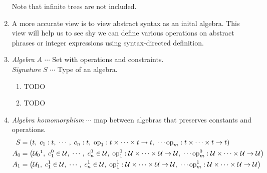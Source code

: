 \begin{enumerate}[label=\protect\circled{\arabic*}]
\begin{center}
    \end{center}

    Note that infinite trees are not included.

  \item
    A more accurate view is to view abstract syntax as an inital algebra. This
    view will help us to see shy we can define various operations on abstract
    phrases or integer expressions using syntax-directed definition.

  \item
    \emph{Algebra} $A$ $\cdots$ Set with operations and constraints. \\
    \emph{Signature} $S$ $\cdots$ Type of an algebra.

    \begin{exampletab}
      \begin{enumerate}[label=(\roman*)]
        \item TODO
        \item TODO
      \end{enumerate}
    \end{exampletab}

  \item
    \emph{Algebra homomorphism} $\cdots$ map between algebras that
    preserves constants and operations.
    \begin{align*}
      S &= \prths{
      t,\; c_1 : t,\; \cdots ,\; c_n : t ,\;
      \textrm{op}_1 : t \times \cdots \times t \rightarrow t ,\; \cdots
      \textrm{op}_m : t \times \cdots \times t \rightarrow t
      }
      \\
      A_0 &= \prths{
      \mathcal{U}_0\footnotemark,\;
      c_1^0 \in \mathcal{U} ,\;
      \cdots ,\;
      c_n^0 \in \mathcal{U} ,\;
      \textrm{op}_1^0 :
      \mathcal{U} \times \cdots \times \mathcal{U} \rightarrow \mathcal{U},\; \cdots
      \textrm{op}_m^0 :
      \mathcal{U} \times \cdots \times \mathcal{U} \rightarrow \mathcal{U}
      }
      \\
      A_1 &= \prths{
      \mathcal{U}_1,\;
      c_1^1 \in \mathcal{U} ,\;
      \cdots ,\;
      c_n^1 \in \mathcal{U} ,\;
      \textrm{op}_1^1 :
      \mathcal{U} \times \cdots \times \mathcal{U} \rightarrow \mathcal{U},\; \cdots
      \textrm{op}_m^1 :
      \mathcal{U} \times \cdots \times \mathcal{U} \rightarrow \mathcal{U}
      }
    \end{align*}


\end{enumerate}
